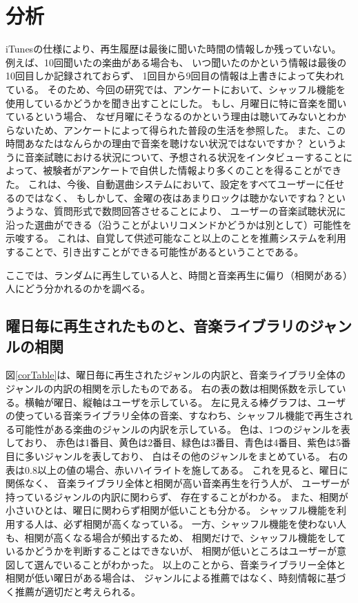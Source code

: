 \documentclass[11pt, twocolumn]{jsarticle}
\begin{document}
\section{分析}
iTunesの仕様により、再生履歴は最後に聞いた時間の情報しか残っていない。
例えば、10回聞いたの楽曲がある場合も、
いつ聞いたのかという情報は最後の10回目しか記録されておらず、
1回目から9回目の情報は上書きによって失われている。
そのため、今回の研究では、アンケートにおいて、シャッフル機能を使用しているかどうかを聞き出すことにした。
もし、月曜日に特に音楽を聞いているという場合、
なぜ月曜にそうなるのかという理由は聴いてみないとわからないため、アンケートによって得られた普段の生活を参照した。
また、この時間あなたはなんらかの理由で音楽を聴けない状況ではないですか？
というように音楽試聴における状況について、予想される状況をインタビューすることによって、被験者がアンケートで自供した情報より多くのことを得ることができた。
これは、今後、自動選曲システムにおいて、設定をすべてユーザーに任せるのではなく、
もしかして、金曜の夜はあまりロックは聴かないですね？というような、質問形式で数問回答させることにより、
ユーザーの音楽試聴状況に沿った選曲ができる（沿うことがよいリコメンドかどうかは別として）可能性を示唆する。
これは、自覚して供述可能なこと以上のことを推薦システムを利用することで、引き出すことができる可能性があるということである。

ここでは、ランダムに再生している人と、時間と音楽再生に偏り（相関がある）人にどう分かれるのかを調べる。
\subsection{曜日毎に再生されたものと、音楽ライブラリのジャンルの相関}

図\ref{corTable}は、曜日毎に再生されたジャンルの内訳と、音楽ライブラリ全体のジャンルの内訳の相関を示したものである。
右の表の数は相関係数を示している。横軸が曜日、縦軸はユーザを示している。
左に見える棒グラフは、ユーザの使っている音楽ライブラリ全体の音楽、すなわち、シャッフル機能で再生される可能性がある楽曲のジャンルの内訳を示している。
色は、1つのジャンルを表しており、
赤色は1番目、黄色は2番目、緑色は3番目、青色は4番目、紫色は5番目に多いジャンルを表しており、
白はその他のジャンルをまとめている。
右の表は0.8以上の値の場合、赤いハイライトを施してある。
これを見ると、曜日に関係なく、
音楽ライブラリ全体と相関が高い音楽再生を行う人が、
ユーザーが持っているジャンルの内訳に関わらず、
存在することがわかる。
また、相関が小さいひとは、曜日に関わらず相関が低いことも分かる。
シャッフル機能を利用する人は、必ず相関が高くなっている。
一方、シャッフル機能を使わない人も、相関が高くなる場合が頻出するため、
相関だけで、シャッフル機能をしているかどうかを判断することはできないが、
相関が低いところはユーザーが意図して選んでいることがわかった。
以上のことから、音楽ライブラリー全体と相関が低い曜日がある場合は、
ジャンルによる推薦ではなく、時刻情報に基づく推薦が適切だと考えられる。
\end{document}
